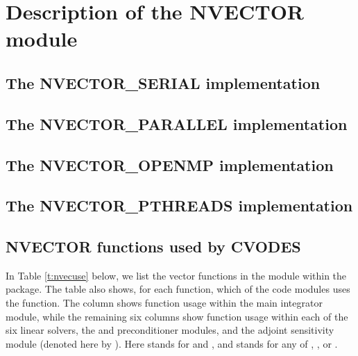 \chapter{Description of the NVECTOR module}\label{s:nvector}


\section{The NVECTOR\_SERIAL implementation}\label{ss:nvec_ser}


\section{The NVECTOR\_PARALLEL implementation}\label{ss:nvec_par}


\section{The NVECTOR\_OPENMP implementation}\label{ss:nvec_openmp}


\section{The NVECTOR\_PTHREADS implementation}\label{ss:nvec_pthreads}


\section{NVECTOR functions used by CVODES}

In Table \ref{t:nvecuse} below, we list the vector functions in the 
{\nvector} module within the {\cvodes} package.
The table also shows, for each function, which of the code modules uses
the function. The {\cvodes} column shows function usage within the main
integrator module, while the remaining six columns show function usage
within each of the six {\cvodes} linear solvers, the {\cvbandpre} and
{\cvbbdpre} preconditioner modules, and the {\cvodes} adjoint sensitivity
module (denoted here by {\cvodea}).  Here {\cvdls} stands for {\cvdense} and
{\cvband}, and {\cvspils} stands for any of {\cvspgmr}, {\cvspbcg}, or {\cvsptfqmr}.

